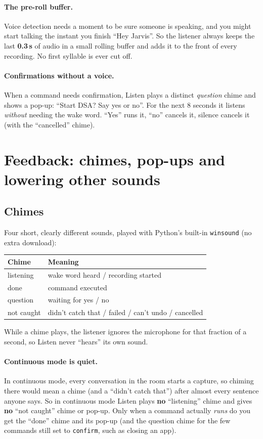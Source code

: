 \documentclass[11pt,a4paper]{article}
\begin{document}
\paragraph{The pre-roll buffer.} Voice detection needs a moment to be sure someone is speaking,
and you might start talking the instant you finish ``Hey Jarvis''. So the listener always
keeps the last \textbf{0.3\,s} of audio in a small rolling buffer and adds it to the front of
every recording. No first syllable is ever cut off.

\paragraph{Confirmations without a voice.} When a command needs confirmation, Listen plays a
distinct \emph{question} chime and shows a pop-up: ``Start DSA? Say yes or no''. For the next
8 seconds it listens \emph{without} needing the wake word. ``Yes'' runs it, ``no'' cancels it,
silence cancels it (with the ``cancelled'' chime).

\section{Feedback: chimes, pop-ups and lowering other sounds}

\subsection{Chimes}
Four short, clearly different sounds, played with Python's built-in \texttt{winsound} (no
extra download):
\begin{center}
\renewcommand{\arraystretch}{1.15}
\begin{tabular}{ll}
\toprule
\textbf{Chime} & \textbf{Meaning} \\
\midrule
listening   & wake word heard / recording started \\
done        & command executed \\
question    & waiting for yes / no \\
not caught  & didn't catch that / failed / can't undo / cancelled \\
\bottomrule
\end{tabular}
\end{center}
While a chime plays, the listener ignores the microphone for that fraction of a second, so
Listen never ``hears'' its own sound.

\paragraph{Continuous mode is quiet.} In continuous mode, every conversation in the room starts
a capture, so chiming there would mean a chime (and a ``didn't catch that'') after almost every
sentence anyone says. So in continuous mode Listen plays \textbf{no} ``listening'' chime and gives
\textbf{no} ``not caught'' chime or pop-up. Only when a command actually \emph{runs} do you get the
``done'' chime and its pop-up (and the question chime for the few commands still set to
\texttt{confirm}, such as closing an app).
\end{document}
